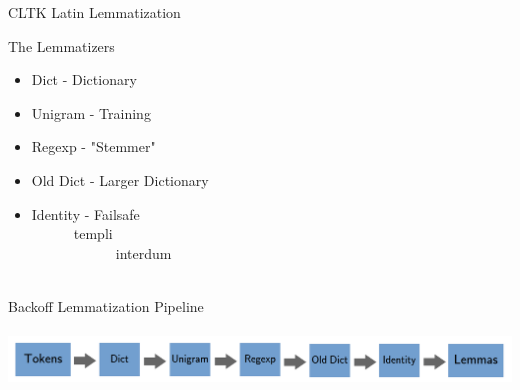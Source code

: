 \documentclass[aspectratio=169,xcolor=dvipsnames]{beamer}
\begin{document}
\begin{frame}[t]{CLTK Latin Lemmatization}

 {\large The Lemmatizers}\\
    \begin{itemize}
        \item Dict - Dictionary
        \item Unigram - Training %
        \item Regexp - "Stemmer"
        \item Old Dict - Larger Dictionary
        \item Identity - Failsafe \\%
        \ \ \ \ \ \ templi \rightarrow{} \text{\textcolor{red}{templi}} \\
        \ \ \ \ \ \ \ \ \ \ \ \ interdum \rightarrow{} \text{{\textcolor{ForestGreen}{interdum}}}  \\ \ \\
    \end{itemize}
        {\large Backoff Lemmatization Pipeline}\\
    \ \\
    \includegraphics[width=1\textwidth] {cltk_backoff_model_v1.png} %
    
\end{frame}
\end{document}
